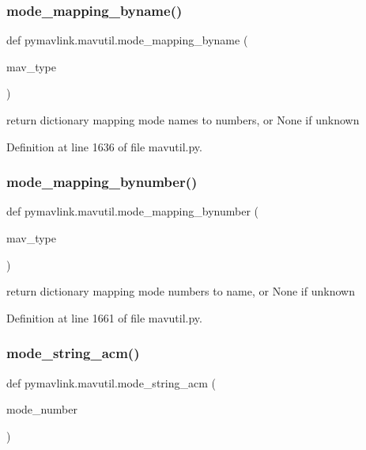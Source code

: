 \subsubsection{\texorpdfstring{mode\_mapping\_byname()}{mode\_mapping\_byname()}}
{\footnotesize\ttfamily def pymavlink.\+mavutil.\+mode\+\_\+mapping\+\_\+byname (\begin{DoxyParamCaption}\item[{}]{mav\+\_\+type }\end{DoxyParamCaption})}

\begin{DoxyVerb}return dictionary mapping mode names to numbers, or None if unknown\end{DoxyVerb}
 

Definition at line 1636 of file mavutil.\+py.

\mbox{\label{namespacepymavlink_1_1mavutil_a5cbe38343057f0223a146df80d3f23a8}} 
\subsubsection{\texorpdfstring{mode\_mapping\_bynumber()}{mode\_mapping\_bynumber()}}
{\footnotesize\ttfamily def pymavlink.\+mavutil.\+mode\+\_\+mapping\+\_\+bynumber (\begin{DoxyParamCaption}\item[{}]{mav\+\_\+type }\end{DoxyParamCaption})}

\begin{DoxyVerb}return dictionary mapping mode numbers to name, or None if unknown\end{DoxyVerb}
 

Definition at line 1661 of file mavutil.\+py.

\mbox{\label{namespacepymavlink_1_1mavutil_a354ee02d2aa8af5107fc1537f58294dc}} 
\subsubsection{\texorpdfstring{mode\_string\_acm()}{mode\_string\_acm()}}
{\footnotesize\ttfamily def pymavlink.\+mavutil.\+mode\+\_\+string\+\_\+acm (\begin{DoxyParamCaption}\item[{}]{mode\+\_\+number }\end{DoxyParamCaption})}

